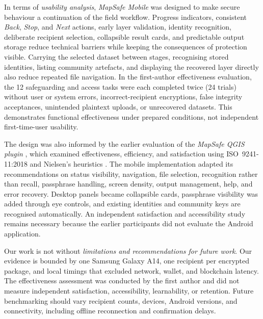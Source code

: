 \documentclass[]{interact}
\begin{document}
In terms of \textit{usability analysis}, \textit{MapSafe Mobile} was designed to make secure behaviour a continuation of the field workflow. Progress indicators, consistent \emph{Back}, \emph{Stop}, and \emph{Next} actions, early layer validation, identity recognition, deliberate recipient selection, collapsible result cards, and predictable output storage reduce technical barriers while keeping the consequences of protection visible. Carrying the selected dataset between stages, recognising stored identities, listing community artefacts, and displaying the recovered layer directly also reduce repeated file navigation. In the first-author effectiveness evaluation, the 12 safeguarding and access tasks were each completed twice (24 trials) without user or system errors, incorrect-recipient encryptions, false integrity acceptances, unintended plaintext uploads, or unrecovered datasets. This demonstrates functional effectiveness under prepared conditions, not independent first-time-user usability.

The design was also informed by the earlier evaluation of the \textit{MapSafe QGIS plugin} \citep{sharma2025mapsafe}, which examined effectiveness, efficiency, and satisfaction using ISO~9241-11:2018 \citep{ISO2018ergonomics} and Nielsen's heuristics \citep{nielsen1995conduct}. The mobile implementation adapted its recommendations on status visibility, navigation, file selection, recognition rather than recall, passphrase handling, screen density, output management, help, and error recovery. Desktop panels became collapsible cards, passphrase visibility was added through eye controls, and existing identities and community keys are recognised automatically. An independent satisfaction and accessibility study remains necessary because the earlier participants did not evaluate the Android application.

Our work is not without \textit{limitations and recommendations for future work}. 
Our evidence is bounded by one Samsung Galaxy A14, one recipient per encrypted package, and local timings that excluded network, wallet, and blockchain latency. The effectiveness assessment was conducted by the first author and did not measure independent satisfaction, accessibility, learnability, or retention. Future benchmarking should vary recipient counts, devices, Android versions, and connectivity, including offline reconnection and confirmation delays.
\end{document}
